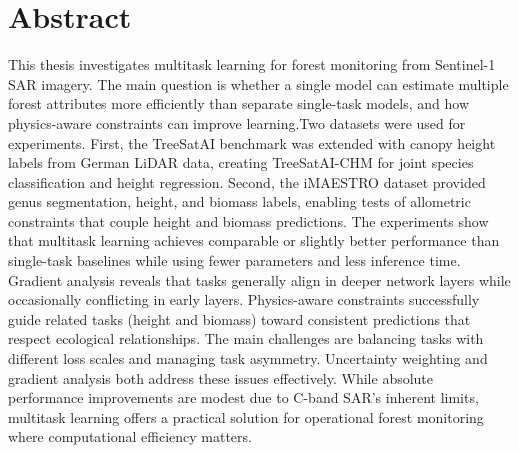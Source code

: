 \chapter*{Abstract}

\vspace{1cm}

This thesis investigates multitask learning for forest monitoring from Sentinel-1 SAR imagery. The main question is whether a single model can estimate multiple forest attributes more efficiently than separate single-task models, and how physics-aware constraints can improve learning.Two datasets were used for experiments. First, the TreeSatAI benchmark was extended with canopy height labels from German LiDAR data, creating TreeSatAI-CHM for joint species classification and height regression. Second, the iMAESTRO dataset provided genus segmentation, height, and biomass labels, enabling tests of allometric constraints that couple height and biomass predictions. The experiments show that multitask learning achieves comparable or slightly better performance than single-task baselines while using fewer parameters and less inference time. Gradient analysis reveals that tasks generally align in deeper network layers while occasionally conflicting in early layers. Physics-aware constraints successfully guide related tasks (height and biomass) toward consistent predictions that respect ecological relationships. The main challenges are balancing tasks with different loss scales and managing task asymmetry. Uncertainty weighting and gradient analysis both address these issues effectively. While absolute performance improvements are modest due to C-band SAR's inherent limits, multitask learning offers a practical solution for operational forest monitoring where computational efficiency matters.
